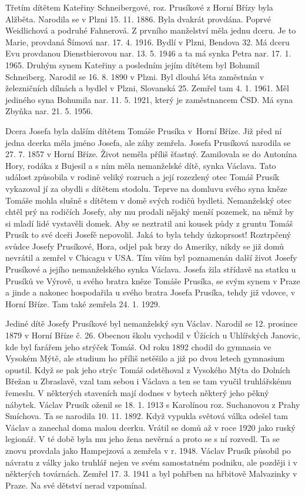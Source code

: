 \documentclass[../dejiny-rodu-prusiku.tex]{subfiles}
\begin{document}
Třetím dítětem Kateřiny Schneibergové, roz. Prusíkové z Horní Břízy byla Alžběta. Narodila se v Plzni 15. 11. 1886. Byla dvakrát provdána. Poprvé Weidlichová a podru­hé Fahnerová. Z prvního manželství měla jednu dceru. Je to Marie, provdaná Šímová nar. 17. 4. 1916. Bydlí v Plzni, Bendova 32. Má dceru Evu provdanou Dienstbierovou nar. 13. 5. 1946 a ta má synka Petra nar. 17. 1. 1965. Druhým synem Kateřiny a posledním jejím dítětem byl Bohu­mil Schneiberg. Narodil se 16. 8. 1890 v Plzni. Byl dlouhá léta zaměstnán v železničních dílnách a bydlel v Plzni, Slovanská 25. Zemřel tam 4. 1. 1961. Měl jediného syna Bohumila nar. 11. 5. 1921, který je zaměstnancem ČSD. Má syna Zbyňka nar. 21. 5. 1956.

Dcera Josefa byla dalším dítětem Tomáše Prusíka v Horní Bříze. Již před ní jedna dcerka měla jméno Josefa, ale záhy zemřela. Josefa Prusíková narodila se 27. 7. 1857 v Horní Bříze. Život neměla příliš šťastný. Zamilovala se do Antonína Hory, rodáka z Bujesil a s ním měla nemanželské dítě, synka Václava. Tato událost způsobila v rodině
veliký rozruch a její rozezlený otec Tomáš Prusík vykazoval jí za obydli s dítětem stodolu. Teprve na domluvu svého syna kněze Tomáše mohla slušně s dítětem v domě svých rodičů bydleti. Nemanželský otec chtěl prý na rodičích Josefy, aby mu prodali nějaký menší pozemek, na němž by si mladí lidé vystavěli domek. Aby se neztratil ani kousek půdy z gruntu Tomáš Prusík to své dceři Josefě nepovolil. Jaká to byla tehdy úzkoprsost! Roztrpčený svůdce Josefy Prusíkové, Hora, odjel pak brzy do Ameriky, nikdy se již domů nevrátil a zemřel v Chicagu v USA. Tím vším byl poznamenán další život Josefy Prusíkové a jejího nemanželského synka Václava. Josefa žila střídavě na statku u Prusíků ve Výrově, u svého bratra kněze Tomáše Prusíka, se svým synem v Praze a jinde a nakonec hospodařila u svého bratra Josefa Prusíka, tehdy již vdovce, v Horní Bříze. Tam také zemřela 24. 1. 1929.

Jediné dítě Josefy Prusíkové byl nemanželský syn Václav. Narodil se 12. prosince 1879 v Horní Bříze č. 26. Obecnou školu vychodil v Úžících u Uhlířských Janovic, kde byl farářem jeho strýček Tomáš. Od roku 1892 chodil do gymna­sia ve Vysokém Mýtě, ale studium ho  příliš netěšilo a již po dvou letech gymnasium opustil. Když se pak jeho strýc Tomáš odstěhoval z Vysokého Mýta do Dolních Břežan u Zbraslavě, vzal tam sebou i Václava a ten se tam vyučil truhlářskému řemeslu. V některých staveních mají dodnes v bytech některý jeho pěkný nábytek. Václav Prusík oženil se 18. 1. 1913 s Karolínou roz. Suchanovou z Prahy Smíchova. Ta se narodila 10. 11. 1892. Když vypukla světová válka odešel tam Václav a zanechal doma malou dcerku. Vrátil se domů až v roce 1920 jako ruský legionář. V té době byla mu jeho žena nevěrná a proto se s ní rozvedl. Ta se znovu provdala jako Hampejzová a zemřela v r. 1948. Václav Prusík působil po návratu z války jako truhlář nejen ve svém samostatném podniku, ale později i v některých to­várnách. Zemřel 17. 3. 1941 a byl pohřben na hřbitově Malvazinky v Praze. Na své dětství nerad vzpomínal.
\end{document}
